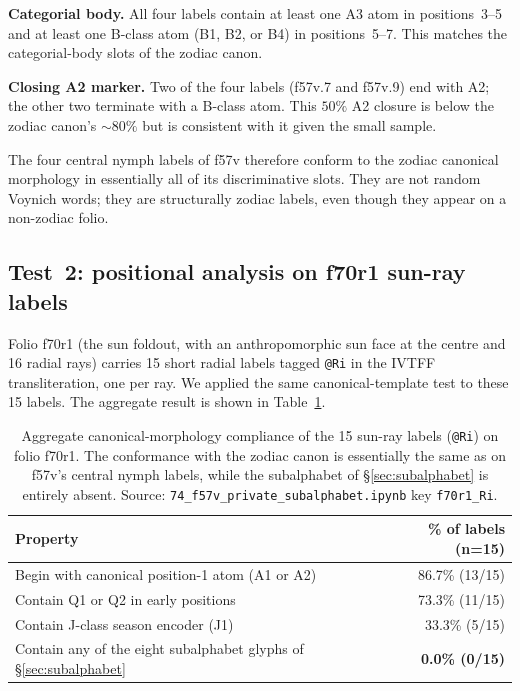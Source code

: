\noindent\textbf{Categorial body.} All four labels contain at least one
A3 atom in positions~3--5 and at least one B-class atom (B1, B2, or
B4) in positions~5--7. This matches the categorial-body slots of the
zodiac canon.

\noindent\textbf{Closing A2 marker.} Two of the four labels (f57v.7 and
f57v.9) end with A2; the other two terminate with a B-class atom. This
$50\%$ A2 closure is below the zodiac canon's $\sim 80\%$ but is
consistent with it given the small sample.

The four central nymph labels of f57v therefore conform to the
zodiac canonical morphology in essentially all of its discriminative
slots. They are not random Voynich words; they are structurally zodiac
labels, even though they appear on a non-zodiac folio.

\subsection{Test~2: positional analysis on f70r1 sun-ray labels}
\label{sec:test_ri}

Folio f70r1 (the sun foldout, with an anthropomorphic sun face at the
centre and 16 radial rays) carries 15 short radial labels tagged
\texttt{@Ri} in the IVTFF transliteration, one per ray. We applied the
same canonical-template test to these 15 labels. The aggregate result is
shown in Table~\ref{tab:ri}.

\begin{table}[h]
\centering
\small
\begin{tabular}{lr}
\toprule
Property & \% of labels (n=15) \\
\midrule
Begin with canonical position-1 atom (A1 or A2)        & 86.7\% (13/15) \\
Contain Q1 or Q2 in early positions                    & 73.3\% (11/15) \\
Contain J-class season encoder (J1)                    & 33.3\% (5/15) \\
Contain any of the eight subalphabet glyphs of \S\ref{sec:subalphabet} & \textbf{0.0\% (0/15)} \\
\bottomrule
\end{tabular}
\caption{Aggregate canonical-morphology compliance of the 15 sun-ray
labels (\texttt{@Ri}) on folio f70r1. The conformance with the zodiac
canon is essentially the same as on f57v's central nymph labels, while
the subalphabet of \S\ref{sec:subalphabet} is entirely absent. Source:
\texttt{74\_f57v\_private\_subalphabet.ipynb} key \texttt{f70r1\_Ri}.}
\label{tab:ri}
\end{table}


